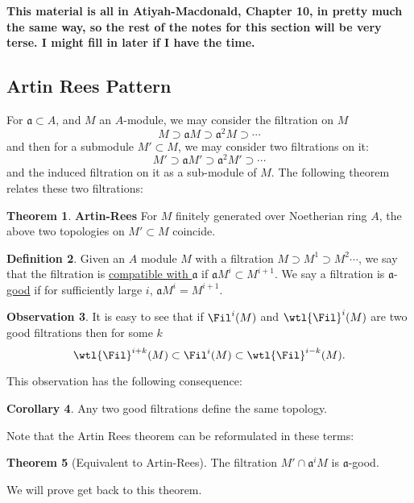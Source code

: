 \documentclass[12 pt]{article}
\theoremstyle{definition}
\newtheorem{thm}{Theorem}[section]
\newtheorem{cor}[thm]{Corollary}
\newtheorem{defn}[thm]{Definition}
\newtheorem{obs}[thm]{Observation}
\renewcommand{\(}{\left(}
\renewcommand{\)}{\right)}
\newcommand\fa{{\mathfrak a}}
\begin{document}
\textbf{This material is all in Atiyah-Macdonald, Chapter 10, in pretty much the same way, so the rest of the notes for this section will be very terse. I might fill in later if I have the time.}






\subsection{Artin Rees Pattern}

For $\fa \subset A$, and $M$ an $A$-module, we may consider the filtration on $M$
\[M \supset \fa M \supset \fa^2 M \supset \cdots\]
and then for a submodule $M' \subset M$, we may consider two filtrations on it:
\[M' \supset \fa M' \supset \fa^2 M' \supset \cdots\]
and the induced filtration on it as a sub-module of $M$. The following theorem relates these two filtrations:
\begin{thm} \textbf{Artin-Rees} For $M$ finitely generated over Noetherian ring $A$, the above two topologies on $M' \subset M$ coincide.
\end{thm}

\begin{defn} Given an $A$ module $M$ with a filtration $M \supset M^1 \supset M^2 \cdots$, we say that the filtration is \underline{compatible with $\fa$} if $\fa M^i \subset M^{i+1}$. We say a filtration is $\fa$-\underline{good} if for sufficiently large $i$, $\fa M^i=M^{i+1}$.
\end{defn}

\begin{obs} It is easy to see that if $\Fil^i(M)$ and $\wtl{\Fil}^i(M)$ are two good filtrations then for some $k$
\[\wtl{\Fil}^{i+k}(M) \subset \Fil^i(M) \subset \wtl{\Fil}^{i-k}(M).\]
\end{obs}



This observation has the following consequence:
\begin{cor} Any two good filtrations define the same topology.
\end{cor}

Note that the Artin Rees theorem can be reformulated in these terms:

\begin{thm} [Equivalent to Artin-Rees] The filtration $M' \cap \fa^i M$ is $\fa$-good.
\end{thm}

We will prove get back to this theorem.
\end{document}
